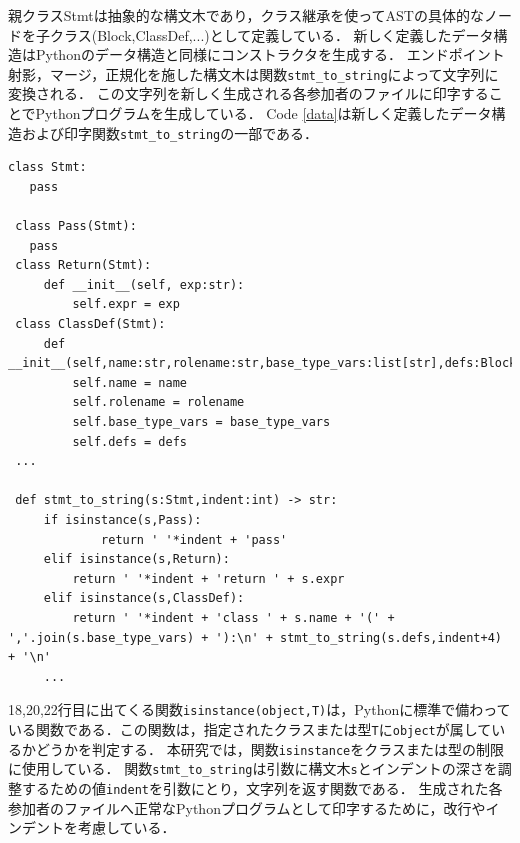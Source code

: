 \documentclass{thesis}
\begin{document}
親クラス\textsf{Stmt}は抽象的な構文木であり，クラス継承を使ってASTの具体的なノードを子クラス(\textsf{Block,ClassDef,...})として定義している．
新しく定義したデータ構造はPythonのデータ構造と同様にコンストラクタを生成する．%
エンドポイント射影，マージ，正規化を施した構文木は関数\texttt{stmt\_to\_string}によって文字列に変換される．
この文字列を新しく生成される各参加者のファイルに印字することでPythonプログラムを生成している．
Code \ref{data}は新しく定義したデータ構造および印字関数\texttt{stmt\_to\_string}の一部である．
\begin{lstlisting}[caption=data.py,label=data]
 class Stmt:
   pass

 class Pass(Stmt):
   pass
 class Return(Stmt):
     def __init__(self, exp:str):
         self.expr = exp
 class ClassDef(Stmt):
     def __init__(self,name:str,rolename:str,base_type_vars:list[str],defs:Block):
         self.name = name
         self.rolename = rolename
         self.base_type_vars = base_type_vars
         self.defs = defs
 ... 
 
 def stmt_to_string(s:Stmt,indent:int) -> str:
     if isinstance(s,Pass):
             return ' '*indent + 'pass'
     elif isinstance(s,Return):
         return ' '*indent + 'return ' + s.expr
     elif isinstance(s,ClassDef):
         return ' '*indent + 'class ' + s.name + '(' + ','.join(s.base_type_vars) + '):\n' + stmt_to_string(s.defs,indent+4) + '\n'
     ...
\end{lstlisting}
18,20,22行目に出てくる関数\texttt{isinstance(object,T)}は，Pythonに標準で備わっている関数である．この関数は，指定されたクラスまたは型\texttt{T}に\texttt{object}が属しているかどうかを判定する．
本研究では，関数\texttt{isinstance}をクラスまたは型の制限に使用している．
関数\texttt{stmt\_to\_string}は引数に構文木\texttt{s}とインデントの深さを調整するための値\texttt{indent}を引数にとり，文字列を返す関数である．
生成された各参加者のファイルへ正常なPythonプログラムとして印字するために，改行やインデントを考慮している．
\end{document}

